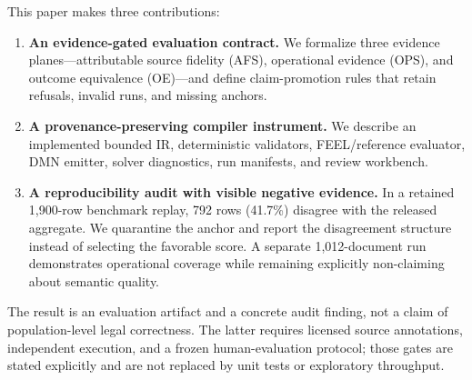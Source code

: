 This paper makes three contributions:
\begin{enumerate}
  \item \textbf{An evidence-gated evaluation contract.} We formalize three
  evidence planes---attributable source fidelity (AFS), operational evidence
  (OPS), and outcome equivalence (OE)---and define claim-promotion rules that
  retain refusals, invalid runs, and missing anchors.
  \item \textbf{A provenance-preserving compiler instrument.} We describe an
  implemented bounded IR, deterministic validators, FEEL/reference evaluator,
  DMN emitter, solver diagnostics, run manifests, and review workbench.
  \item \textbf{A reproducibility audit with visible negative evidence.} In a
  retained 1,900-row benchmark replay, 792 rows (41.7\%) disagree with the
  released aggregate. We quarantine the anchor and report the disagreement
  structure instead of selecting the favorable score. A separate
  1,012-document run demonstrates operational coverage while remaining
  explicitly non-claiming about semantic quality.
\end{enumerate}

The result is an evaluation artifact and a concrete audit finding, not a claim
of population-level legal correctness. The latter requires licensed source
annotations, independent execution, and a frozen human-evaluation protocol;
those gates are stated explicitly and are not replaced by unit tests or
exploratory throughput.
